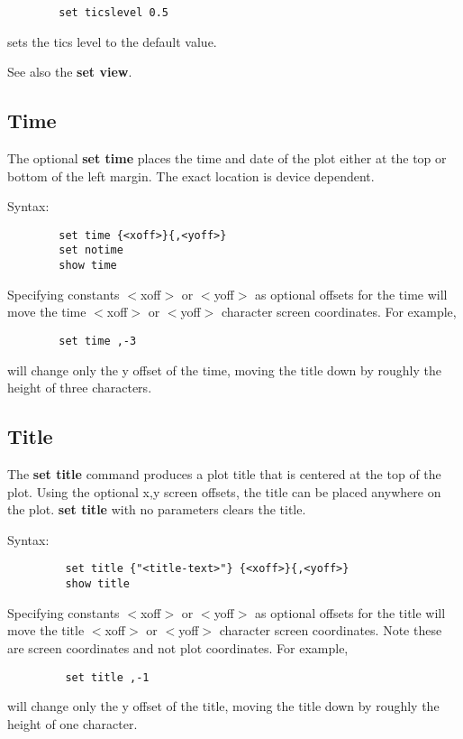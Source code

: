 \begin{verbatim}
        set ticslevel 0.5
\end{verbatim}

sets the tics level to the default value.

See also the {\bf set view}.
\subsection{Time}
The optional {\bf set time} places the time and date of the plot either
at the top or bottom of the left margin. The exact location is
device dependent.

Syntax:
\begin{verbatim}
        set time {<xoff>}{,<yoff>}
        set notime
        show time
\end{verbatim}

Specifying constants $<$xoff$>$ or $<$yoff$>$ as optional offsets for the time
will move the time $<$xoff$>$ or $<$yoff$>$ character screen coordinates. For
example,

\begin{verbatim}
        set time ,-3
\end{verbatim}

will change only the y offset of the time, moving the title down by
roughly the height of three characters.

\subsection{Title}
The {\bf set title} command produces a plot title that is centered at the
top of the plot. Using the optional x,y screen offsets, the title
can be placed anywhere on the plot. {\bf set title} with no parameters
clears the title.

Syntax:
\begin{verbatim}
         set title {"<title-text>"} {<xoff>}{,<yoff>}
         show title
\end{verbatim}

Specifying constants $<$xoff$>$ or $<$yoff$>$ as optional offsets for the
title will move the title $<$xoff$>$ or $<$yoff$>$ character screen
coordinates. Note these are screen coordinates and not plot
coordinates. For example,

\begin{verbatim}
         set title ,-1
\end{verbatim}

will change only the y offset of the title, moving the title down by
roughly the height of one character.

